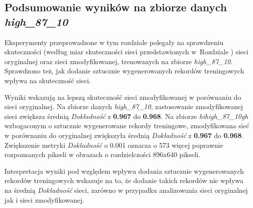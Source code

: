 \subsection{Podsumowanie wyników na zbiorze danych \textit{high\_87\_10}}
Eksperymenty przeprowadzone w tym rozdziale polegały na sprawdzeniu skuteczności (według miar skuteczności sieci przedstawionych w~Rozdziale ) sieci oryginalnej oraz sieci zmodyfikowanej, trenowanych na zbiorze \textit{high\_87\_10}.
Sprawdzono też, jak dodanie sztucznie wygenerowanych rekordów treningowych wpływa na skuteczność sieci.


Wyniki wskazują na lepszą skuteczność sieci zmodyfikowanej w porównaniu do sieci oryginalnej.
Na zbiorze danych \textit{high\_87\_10}, zastosowanie zmodyfikowanej sieci zwiększa średnią \textit{Dokładność} z \textbf{0.967} do \textbf{0.968}.
Na zbiorze \textit{hihigh\_87\_10gh} wzbogaconym o sztucznie wygenerowane rekordy treningowe, zmodyfikowana sieć w porównaniu do oryginalnej zwiększyła średnią \textit{Dokładność} z \textbf{0.967} do \textbf{0.968}.
Zwiększenie metryki \textit{Dokładność} o 0.001 oznacza o 573 więcej poprawnie rozpoznanych pikseli w obrazach o rozdzielczości 896x640 pikseli.


Interpretacja wyniki pod względem wpływu dodania sztucznie wygenerowanych rekordów treningowych wskazuje na to, że dodanie takich rekordów nie wpływa na średnią \textit{Dokładność} sieci, zarówno w przypadku analizowania sieci oryginalnej jak i sieci zmodyfikowanej.
